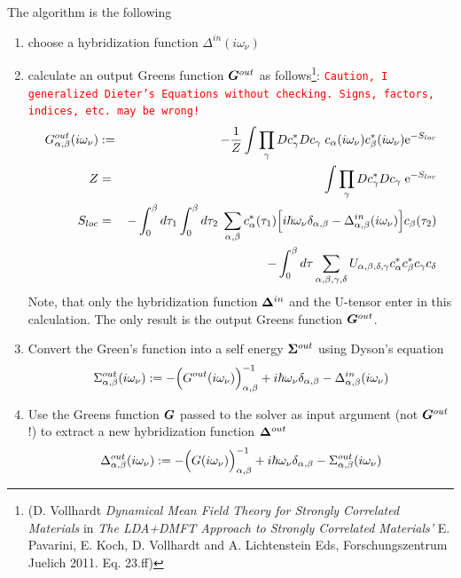 \documentclass[11pt,a4paper]{report}
\begin{document}
The algorithm is the following
\begin{enumerate}
\item choose a hybridization function $\Delta^{in}(i\omega_\nu)$
\item calculate an output Greens function $\bm{G}^{out}$ as
  follows\footnote{(D. Vollhardt \textit{Dynamical Mean Field Theory
      for Strongly Correlated Materials} in \textit{The LDA+DMFT
      Approach to Strongly Correlated Materials'} E. Pavarini,
    E. Koch, D. Vollhardt and A. Lichtenstein Eds, Forschungszentrum
    Juelich 2011. Eq. 23.ff)}: \textcolor{red}{\texttt{Caution, I
      generalized Dieter's Equations without checking. Signs, factors,
      indices, etc. may be wrong!}}
\begin{eqnarray*}
G^{out}_{\alpha,\beta}(i\omega_\nu)&:=&
-\frac{1}{Z}\int\prod_{\gamma} Dc^*_\gamma Dc_\gamma\;
c_\alpha(i\omega_\nu)c^*_\beta(i\omega_\nu) \mathrm{e}^{-S_{loc}}
\\
Z&=&\int\prod_{\gamma} Dc^*_\gamma Dc_\gamma\;\mathrm{e}^{-S_{loc}}
\\
S_{loc}&=&-\int_0^\beta d\tau_1\int_0^\beta d\tau_2\;
\sum_{\alpha,\beta}c^*_\alpha(\tau_1)
\Bigl[
i\hbar\omega_\nu\delta_{\alpha,\beta}-\Delta^{in}_{\alpha,\beta}(i\omega_\nu)
\Bigr]
c_\beta(\tau_2)
\nonumber\\
&&-\int_0^\beta d\tau \sum_{\alpha,\beta,\gamma,\delta}
U_{\alpha,\beta,\delta,\gamma}
 c^*_\alpha c^*_\beta c_\gamma c_\delta
\end{eqnarray*}
Note, that only the hybridization function $\bm{\Delta}^{in}$ and the
  U-tensor enter in this calculation. The only result is the output
  Greens function $\bm{G}^{out}$.
%
\item Convert the Green's function into a self energy $\bm{\Sigma}^{out}$
  using Dyson's equation
\begin{eqnarray}
\Sigma^{out}_{\alpha,\beta}(i\omega_\nu)
:=-\Bigl(G^{out}(i\omega_\nu)\Bigr)^{-1}_{\alpha,\beta}
+i\hbar\omega_\nu\delta_{\alpha,\beta}
-\Delta^{in}_{\alpha,\beta}(i\omega_\nu)
\label{eq:sigmaout}
\end{eqnarray}
%
\item Use the Greens function $\bm{G}$ passed
  to the solver as input argument (not
  $\bm{G}^{out}$!)  to extract a new
  hybridization function $\bm{\Delta}^{out}$
\begin{eqnarray}
\Delta^{out}_{\alpha,\beta}(i\omega_\nu)
:=-\Bigl(G(i\omega_\nu)\Bigr)^{-1}_{\alpha,\beta}
+i\hbar\omega_\nu\delta_{\alpha,\beta}-\Sigma^{out}_{\alpha,\beta}(i\omega_\nu)
\label{eq:deltaout}
\end{eqnarray}
\end{enumerate}
\end{document}
